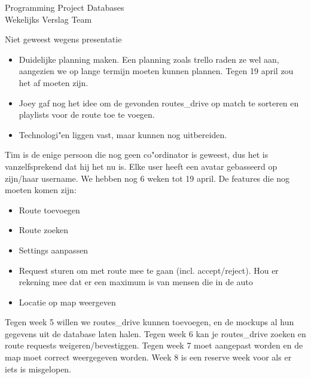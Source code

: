 \documentclass{article}
\newcounter{team}
\begin{document}

	\begin{Minutes}{Programming Project Databases \\ Wekelijks Verslag Team }
		\missingNoExcuse{/}
		\missingExcused{/}

		\maketitle

		Niet geweest wegens presentatie

		\begin{itemize}
		    \item Duidelijke planning maken. Een planning zoals trello raden ze wel aan, aangezien we op lange termijn moeten kunnen plannen. Tegen 19 april zou het af moeten zijn.
		    \item Joey gaf nog het idee om de gevonden routes_drive op match te sorteren en playlists voor de route toe te voegen.
		    \item Technologi"en liggen vast, maar kunnen nog uitbereiden.
		\end{itemize}






				    Tim is de enige persoon die nog geen co"ordinator is geweest, dus het is vanzelfsprekend dat hij het nu is.
			        Elke user heeft een avatar gebasseerd op zijn/haar username.
			        We hebben nog 6 weken tot 19 april.
			        De features die nog moeten komen zijn:
			        \begin{itemize}
			            \item Route toevoegen
			            \item Route zoeken
			            \item Settings aanpassen
			            \item Request sturen om met route mee te gaan (incl. accept/reject). Hou er rekening mee dat er een maximum is van mensen die in de auto
			            \item Locatie op map weergeven
			        \end{itemize}
			        Tegen week 5 willen we routes_drive kunnen toevoegen, en de mockups al hun gegevens uit de database laten halen.
			        Tegen week 6 kan je routes_drive zoeken en route requests weigeren/bevestiggen.
			        Tegen week 7 moet aangepast worden en de map moet correct weergegeven worden.
			        Week 8 is een reserve week voor als er iets is misgelopen.


\end{Minutes}
\end{document}
